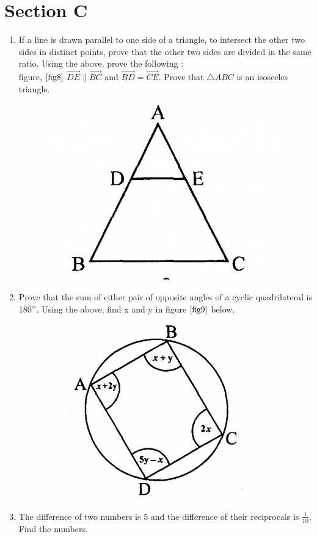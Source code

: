 \documentclass[journal,12pt,twocolumn]{IEEEtran}
\renewcommand\thesection{\arabic{section}}
\begin{document}
\section{Section C}
\renewcommand{\theequation}{\theenumi}
\begin{enumerate}[label=\thesection.\arabic*.,ref=\thesection.\theenumi]
\item If a line is drawn parallel to one side of a triangle, to intersect the other two sides in distinct points, prove that the other two sides are divided in the same ratio. Using the above, prove the following :\\ figure, $\ref{fig8}$ $\vec{DE} \| \vec{BC}$ and $\vec{BD}=\vec{CE}$. Prove that $\triangle{ABC}$ is an isosceles triangle.
\begin{figure}[h!]
	\centering
    \includegraphics[width=0.5\columnwidth,center]{8.png}
    \caption{}
    \label{fig8}
\end{figure}
 
 \item Prove that the sum of either pair of opposite angles of a cyclic quadrilateral is 180$\degree$. Using the above, find x and y in figure $\ref{fig9}$ below.
 \begin{figure}[h!]
	\centering
    \includegraphics[width=0.5\columnwidth,center]{9.png}
    \caption{}
    \label{fig9}
\end{figure}
 
 \item The difference of two numbers is 5 and the difference of their reciprocals is $\displaystyle\frac{1}{10}$. Find the numbers.
 

\end{enumerate}
\end{document}
